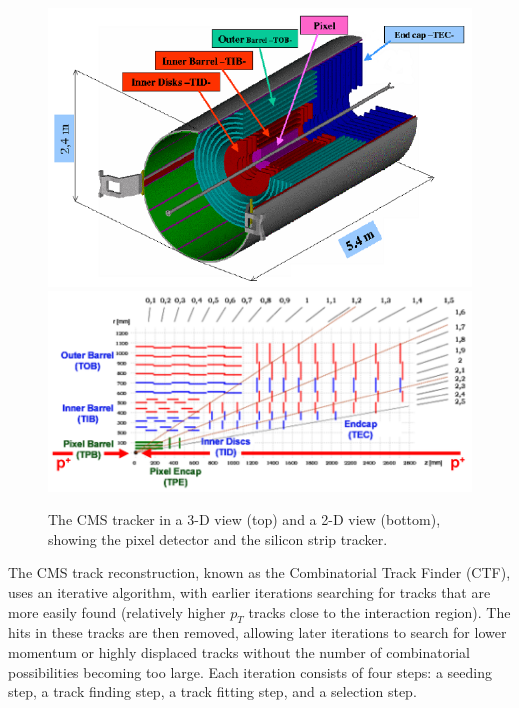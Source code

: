 \documentclass[preprint,sort&compress]{elsarticle}
\begin{document}
\begin{figure}[!Hhtb]
\begin{center}
    \includegraphics[width=1.0\textwidth]{CMSTrackerLayout.pdf}
    \includegraphics[width=1.0\textwidth]{CMS2Dtracker.png}
    \caption{The CMS tracker in a 3-D view (top) and a 2-D view (bottom), showing the pixel detector and the silicon
    strip tracker. \label{fig:tracker}}
    \end{center}
\end{figure}

The CMS track reconstruction, known as the Combinatorial Track Finder (CTF), uses an iterative algorithm, with
earlier iterations searching for tracks that are more easily found (relatively higher $p_T$ tracks close to
the interaction region). The hits in these tracks are then removed, allowing later iterations to search for
lower momentum or highly displaced tracks without the number of combinatorial possibilities becoming too
large. Each iteration consists of four steps: a seeding step, a track finding step, a track fitting step, and
a selection step.
\end{document}
